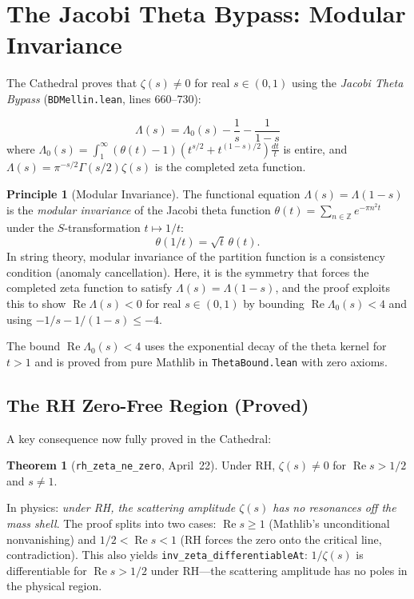 \documentclass[11pt,a4paper]{article}
\theoremstyle{definition}
\newtheorem{theorem}[definition]{Theorem}
\newtheorem{principle}[definition]{Principle}
\newcommand{\re}{\operatorname{Re}}
\newcommand{\ZZ}{\mathbb{Z}}
\newcommand{\lean}[1]{\texttt{#1}}
\begin{document}
\section{The Jacobi Theta Bypass: Modular Invariance}
\label{sec:theta}

The Cathedral proves that $\zeta(s) \neq 0$ for real $s \in (0,1)$
using the \emph{Jacobi Theta Bypass} (\lean{BDMellin.lean}, lines 660--730):

\[
  \Lambda(s) = \Lambda_0(s) - \frac{1}{s} - \frac{1}{1-s}
\]
where $\Lambda_0(s) = \int_1^\infty (\theta(t) - 1)(t^{s/2} + t^{(1-s)/2})\frac{dt}{t}$
is entire, and $\Lambda(s) = \pi^{-s/2}\Gamma(s/2)\zeta(s)$ is the
completed zeta function.

\begin{principle}[Modular Invariance]
The functional equation $\Lambda(s) = \Lambda(1-s)$ is the
\emph{modular invariance} of the Jacobi theta function
$\theta(t) = \sum_{n \in \ZZ} e^{-\pi n^2 t}$ under the
$S$-transformation $t \mapsto 1/t$:
\[
  \theta(1/t) = \sqrt{t}\,\theta(t).
\]
In string theory, modular invariance of the partition function is a
consistency condition (anomaly cancellation). Here, it is the
symmetry that forces the completed zeta function to satisfy
$\Lambda(s) = \Lambda(1-s)$, and the proof exploits this to show
$\re\Lambda(s) < 0$ for real $s \in (0,1)$ by bounding
$\re\Lambda_0(s) < 4$ and using $-1/s - 1/(1-s) \leq -4$.
\end{principle}

The bound $\re\Lambda_0(s) < 4$ uses the exponential decay of the
theta kernel for $t > 1$ and is proved from pure Mathlib in
\lean{ThetaBound.lean} with zero axioms.

\subsection{The RH Zero-Free Region (Proved)}

A key consequence now fully proved in the Cathedral:

\begin{theorem}[\lean{rh\_zeta\_ne\_zero}, April~22]
Under RH, $\zeta(s) \neq 0$ for $\re s > 1/2$ and $s \neq 1$.
\end{theorem}

In physics: \emph{under RH, the scattering amplitude $\zeta(s)$ has
no resonances off the mass shell}. The proof splits into two cases:
$\re s \geq 1$ (Mathlib's unconditional nonvanishing) and
$1/2 < \re s < 1$ (RH forces the zero onto the critical line,
contradiction). This also yields \lean{inv\_zeta\_differentiableAt}:
$1/\zeta(s)$ is differentiable for $\re s > 1/2$ under RH---the
scattering amplitude has no poles in the physical region.
\end{document}
